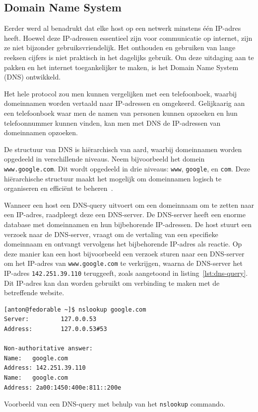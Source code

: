\subsection{Domain Name System}
\label{netwerk_dns}

Eerder werd al benadrukt dat elke host op een netwerk minstens één IP-adres heeft.
Hoewel deze IP-adressen essentieel zijn voor communicatie op internet, zijn ze niet bijzonder gebruiksvriendelijk.
Het onthouden en gebruiken van lange reeksen cijfers is niet praktisch in het dagelijks gebruik.
Om deze uitdaging aan te pakken en het internet toegankelijker te maken, is het Domain Name System (DNS) ontwikkeld.

Het hele protocol zou men kunnen vergelijken met een telefoonboek, waarbij domeinnamen worden vertaald naar IP-adressen en omgekeerd.
Gelijkaarig aan een telefoonboek waar men de namen van personen kunnen opzoeken en hun telefoonnummer kunnen vinden, kan men met DNS de IP-adressen van domeinnamen opzoeken.

De structuur van DNS is hi\"erarchisch van aard, waarbij domeinnamen worden opgedeeld in verschillende niveaus.
Neem bijvoorbeeld het domein \texttt{www.google.com}. Dit wordt opgedeeld in drie niveaus: \texttt{www}, \texttt{google}, en \texttt{com}.
Deze hi\"erarchische structuur maakt het mogelijk om domeinnamen logisch te organiseren en effici\"ent te beheren~\autocite{dordal2020}.

Wanneer een host een DNS-query uitvoert om een domeinnaam om te zetten naar een IP-adres, raadpleegt deze een DNS-server.
De DNS-server heeft een enorme database met domeinnamen en hun bijbehorende IP-adressen.
De host stuurt een verzoek naar de DNS-server, vraagt om de vertaling van een specifieke domeinnaam en ontvangt vervolgens het bijbehorende IP-adres als reactie.
Op deze manier kan een host bijvoorbeeld een verzoek sturen naar een DNS-server om het IP-adres van \texttt{www.google.com} te verkrijgen, waarna de DNS-server het IP-adres \texttt{142.251.39.110} teruggeeft, zoals aangetoond in listing~\ref{lst:dns-query}.
Dit IP-adres kan dan worden gebruikt om verbinding te maken met de betreffende website.

\begin{listing}
  \begin{verbatim}
[anton@fedorable ~]$ nslookup google.com
Server:         127.0.0.53
Address:        127.0.0.53#53

Non-authoritative answer:
Name:   google.com
Address: 142.251.39.110
Name:   google.com
Address: 2a00:1450:400e:811::200e
  \end{verbatim}
  \caption[DNS-query met \texttt{nslookup}]{Voorbeeld van een DNS-query met behulp van het \texttt{nslookup} commando.}
  \label{lst:dns-query}
\end{listing}
